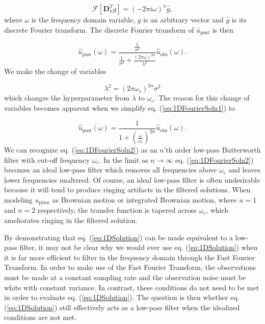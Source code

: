 \documentclass[10pt,a4paper]{article}
\begin{document}
\begin{equation}\label{eq:Property2}
  \mathcal{F}[\mathbf{D}^T_ng] = (-2\pi i\omega)^n \hat{g},
\end{equation}
where $\omega$ is the frequency domain variable, $g$ is an arbitrary vector and $\hat{g}$ is its discrete Fourier transform.  The discrete Fourier transform of $\bar{u}_\mathrm{post}$ is then

\begin{equation}\label{eq:1DFourierSoln1}
\hat{u}_\mathrm{post}(\omega) = \frac{\frac{1}{\sigma^2}}
                                  {\frac{1}{\sigma^2} +                  
                                  \frac{(2\pi\omega)^{2n}}{\lambda^2}}
                                  \hat{u}_\mathrm{obs}(\omega).
\end{equation}
We make the change of variables 

\begin{equation}\label{eq:VariableChange}
\lambda^2 = (2\pi\omega_c)^{2n}\sigma^2
\end{equation}
which changes the hyperparameter from $\lambda$ to $\omega_c$.  The reason for this change of variables becomes apparent when we simplify eq. (\ref{eq:1DFourierSoln1}) to

\begin{equation}\label{eq:1DFourierSoln2}
\hat{u}_\mathrm{post}(\omega) = \frac{1}
                                  {1 + \left(\frac{\omega}{\omega_c}\right)^{2n}}
                                  \hat{u}_\mathrm{obs}(\omega).        
\end{equation}
We can recognize eq. (\ref{eq:1DFourierSoln2}) as an $n$'th order low-pass Butterworth filter with cut-off frequency $\omega_c$.  In the limit as $n\to \infty$ eq. (\ref{eq:1DFourierSoln2}) becomes an ideal low-pass filter which removes all frequencies above $\omega_c$ and leaves lower frequencies unaltered.  Of course, an ideal low-pass filter is often undesirable because it will tend to produce ringing artifacts in the filtered solutions.  When modeling $u_\mathrm{prior}$ as Brownian motion or integrated Brownian motion, where $n=1$ and $n=2$ respectively, the transfer function is tapered across $\omega_c$, which ameliorates ringing in the filtered solution.

By demonstrating that eq. (\ref{eq:1DSolution}) can be made equivalent to a low-pass filter, it may not be clear why we would ever use eq. (\ref{eq:1DSolution}) when it is far more efficient to filter in the frequency domain through the Fast Fourier Transform.  In order to make use of the Fast Fourier Transform, the observations must be made at a constant sampling rate and the observation noise must be  white with constant variance.  In contrast, these conditions do not need to be met in order to evaluate eq. (\ref{eq:1DSolution}).  The question is then whether eq. (\ref{eq:1DSolution}) still effectively acts as a low-pass filter when the idealized conditions are not met.  
\end{document}
